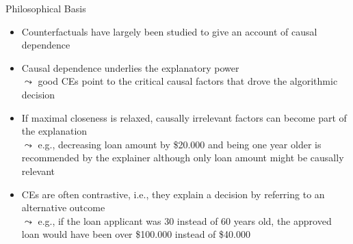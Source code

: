 \documentclass[11pt,compress,t,notes=noshow, aspectratio=169, xcolor=table, usenames,dvipsnames]{beamer}
\begin{document}
\begin{frame}{Philosophical Basis}
	\begin{itemize}[<+->]
	\item Counterfactuals have largely been studied to give an account of causal dependence
		\item Causal dependence underlies the explanatory power\\
		$\leadsto$ good CEs point to the critical causal factors that drove the algorithmic decision
		\item If maximal closeness is relaxed, causally irrelevant factors can become part of the explanation\\
		$\leadsto$ e.g., decreasing loan amount by \$20.000 and being one year older is recommended by the explainer although only loan amount might be causally relevant
		\item CEs are often contrastive, i.e., they explain a decision by referring to an alternative outcome\\
		$\leadsto$ e.g., if the loan applicant was 30 instead of 60 years old, the approved loan would have been over \$100.000 instead of \$40.000%
	\end{itemize}
\end{frame}

\end{document}
